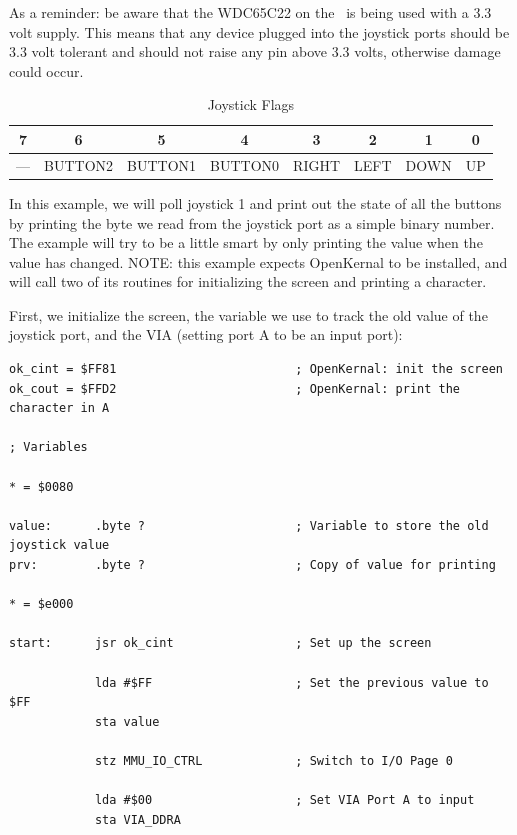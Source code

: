 As a reminder: be aware that the WDC65C22 on the \jr\ is being used with a 3.3 volt supply. This means that any device plugged into the joystick ports should be 3.3 volt tolerant and should not raise any pin above 3.3 volts, otherwise damage could occur.

\begin{table}[ht]
    \begin{center}
        \begin{tabular}{|c|c|c|c|c|c|c|c|} \hline
            7 & 6 & 5 & 4 & 3 & 2 & 1 & 0 \\\hline\hline
            --- & BUTTON2 & BUTTON1 & BUTTON0 & RIGHT & LEFT & DOWN & UP \\ \hline
        \end{tabular}
    \end{center}
    \caption{Joystick Flags}
    \label{tab:via_joystick}
\end{table}

In this example, we will poll joystick 1 and print out the state of all the buttons by printing the byte we read from the joystick port as a simple binary number. The example will try to be a little smart by only printing the value when the value has changed. NOTE: this example expects OpenKernal to be installed, and will call two of its routines for initializing the screen and printing a character.

First, we initialize the screen, the variable we use to track the old value of the joystick port, and the VIA (setting port A to be an input port):
\begin{verbatim}
ok_cint = $FF81                         ; OpenKernal: init the screen
ok_cout = $FFD2                         ; OpenKernal: print the character in A

; Variables

* = $0080

value:      .byte ?                     ; Variable to store the old joystick value
prv:        .byte ?                     ; Copy of value for printing

* = $e000

start:      jsr ok_cint                 ; Set up the screen

            lda #$FF                    ; Set the previous value to $FF
            sta value

            stz MMU_IO_CTRL             ; Switch to I/O Page 0

            lda #$00                    ; Set VIA Port A to input
            sta VIA_DDRA
\end{verbatim}


